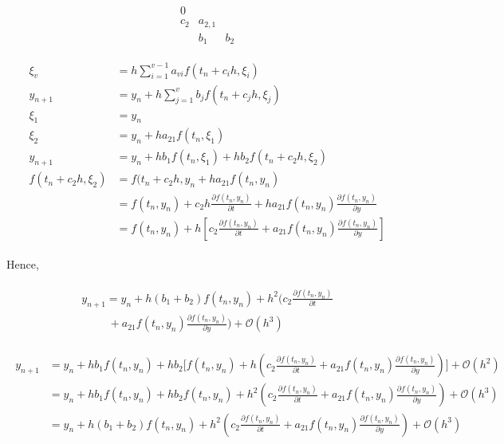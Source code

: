 \documentclass[12pt,a4paper]{article}
\begin{document}
\begin{equation*}
  \begin{array}{c|cccc}
    0       \\
    c_2       & a_{2,1}  \\
    \hline
    \,        & b_1      & b_2  
  \end{array}
\end{equation*}

\begin{align*}
\begin{split}
\xi_v &= h \sum_{i=1}^{v-1}a_{vi}f(t_n + c_ih , \xi_i ) \\
y_{n+1} &= y_n + h \sum_{j=1}^{v}b_jf(t_n + c_jh , \xi_j )\\
\xi_1 &= y_n \\
\xi_2 &= y_n + ha_{21}f(t_n, \xi_1) \\
y_{n+1} &= y_n + hb_1f(t_n, \xi_1) + hb_2f(t_n + c_2h , \xi_2) \\
f(t_n + c_2h, \xi_2) &= f(t_n + c_2h, y_n + ha_{21}f(t_n, y_n) \\
&= {f(t_n,y_n) + c_2h \frac{\partial f(t_n,y_n)}{\partial t} + ha_{21}f(t_n,y_n)\frac{\partial f(t_n,y_n)}{\partial y}} \\
&= {f(t_n,y_n) + h[ c_2 \frac{\partial f(t_n,y_n)}{\partial t} + a_{21}f(t_n,y_n)\frac{\partial f(t_n,y_n)}{\partial y} ] } 
\end{split}
\end{align*}

Hence,

\begin{align*}\label{eqtn 1.2.1}
\begin{split}
y_{n+1} = y_n + h(b_1 + b_2)f(t_n, y_n ) + h^2( c_2 \frac{\partial f(t_n,y_n)}{\partial t} \\
\hspace{1cm} + a_{21}f(t_n,y_n)\frac{\partial f(t_n,y_n)}{\partial y} )  + \mathcal{O}(h^3) 
\end{split}
\end{align*}

\begin{align*}
\begin{split}
y_{n+1} &= y_n + hb_1f(t_n, y_n ) + hb_2[{f(t_n,y_n) + h( c_2 \frac{\partial f(t_n,y_n)}{\partial t} + a_{21}f(t_n,y_n)\frac{\partial f(t_n,y_n)}{\partial y} )]} + \mathcal{O}(h^2) \\
&= y_n + hb_1f(t_n, y_n ) + hb_2f(t_n,y_n) + h^2( c_2 \frac{\partial f(t_n,y_n)}{\partial t} + a_{21}f(t_n,y_n)\frac{\partial f(t_n,y_n)}{\partial y} ) + \mathcal{O}(h^3) \\
&= y_n + h(b_1 + b_2)f(t_n, y_n ) + h^2( c_2 \frac{\partial f(t_n,y_n)}{\partial t} + a_{21}f(t_n,y_n)\frac{\partial f(t_n,y_n)}{\partial y} )  + \mathcal{O}(h^3) \\
\end{split}
\end{align*}
\end{document}
